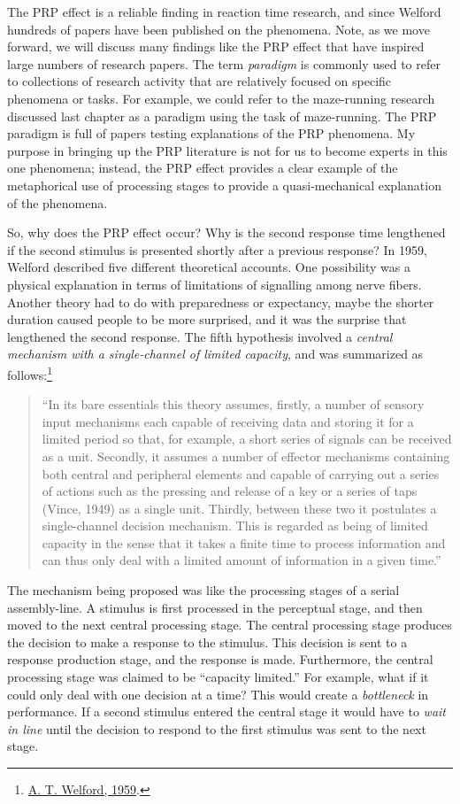 \documentclass[
  oneside,
  12pt]{crumpbook}
\begin{document}
The PRP effect is a reliable finding in reaction time research, and since Welford hundreds of papers have been published on the phenomena. Note, as we move forward, we will discuss many findings like the PRP effect that have inspired large numbers of research papers. The term \emph{paradigm} is commonly used to refer to collections of research activity that are relatively focused on specific phenomena or tasks. For example, we could refer to the maze-running research discussed last chapter as a paradigm using the task of maze-running. The PRP paradigm is full of papers testing explanations of the PRP phenomena. My purpose in bringing up the PRP literature is not for us to become experts in this one phenomena; instead, the PRP effect provides a clear example of the metaphorical use of processing stages to provide a quasi-mechanical explanation of the phenomena.

So, why does the PRP effect occur? Why is the second response time lengthened if the second stimulus is presented shortly after a previous response? In 1959, Welford described five different theoretical accounts. One possibility was a physical explanation in terms of limitations of signalling among nerve fibers. Another theory had to do with preparedness or expectancy, maybe the shorter duration caused people to be more surprised, and it was the surprise that lengthened the second response. The fifth hypothesis involved a \emph{central mechanism with a single-channel of limited capacity}, and was summarized as follows:\footnote{\protect\hyperlink{ref-welfordEvidenceSinglechannelDecision1959}{A. T. Welford, 1959}.}

\begin{quote}
``In its bare essentials this theory assumes, firstly, a number of sensory input mechanisms each capable of receiving data and storing it for a limited period so that, for example, a short series of signals can be received as a unit. Secondly, it assumes a number of effector mechanisms containing both central and peripheral elements and capable of carrying out a series of actions such as the pressing and release of a key or a series of taps (Vince, 1949) as a single unit. Thirdly, between these two it postulates a single-channel decision mechanism. This is regarded as being of limited capacity in the sense that it takes a finite time to process information and can thus only deal with a limited amount of information in a given time.''
\end{quote}

The mechanism being proposed was like the processing stages of a serial assembly-line. A stimulus is first processed in the perceptual stage, and then moved to the next central processing stage. The central processing stage produces the decision to make a response to the stimulus. This decision is sent to a response production stage, and the response is made. Furthermore, the central processing stage was claimed to be ``capacity limited.'' For example, what if it could only deal with one decision at a time? This would create a \emph{bottleneck} in performance. If a second stimulus entered the central stage it would have to \emph{wait in line} until the decision to respond to the first stimulus was sent to the next stage.
\end{document}
